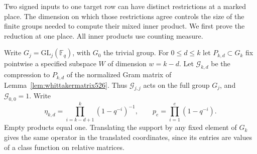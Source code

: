 \documentclass[a4paper,11pt]{article}
\theoremstyle{definition}
\theoremstyle{remark}
\numberwithin{equation}{section}
\begin{document}
Two signed inputs to one target row can have distinct restrictions at a
marked place. The dimension on which those restrictions agree controls
the size of the finite groups needed to compute their mixed inner product.
We first prove the reduction at one place. All inner products use
counting measure.

Write \(G_j=\mathrm{GL}_j(\mathbb F_q)\), with \(G_0\) the trivial
group. For \(0\le d\le k\) let \(P_{k,d}\subset G_k\) fix pointwise a
specified subspace \(W\) of dimension \(w=k-d\). Let \(\mathcal G_{k,d}\)
be the compression to \(P_{k,d}\) of the normalized Gram matrix of
Lemma~\ref{lem:whittakermatrix526}. Thus \(\mathcal G_{j,j}\) acts on
the full group \(G_j\), and \(\mathcal G_{0,0}=1\). Write
\[
 \eta_{k,d}=\prod_{i=k-d+1}^k(1-q^{-i})^{-1},
 \qquad p_e=\prod_{i=1}^e(1-q^{-i}).
\]
Empty products equal one. Translating the support by any fixed element
of \(G_k\) gives the same operator in the translated coordinates, since
its entries are values of a class function on relative matrices.
\end{document}
